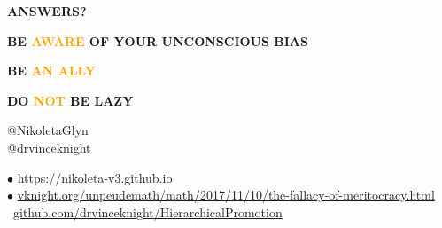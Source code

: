 \documentclass{beamer}
\begin{document}
\begin{frame}
    \centering
    \LARGE \textbf{ANSWERS?}
\end{frame}

\begin{frame}
    \centering
    \LARGE \textbf{BE \textcolor{orange}{AWARE} OF YOUR UNCONSCIOUS BIAS}
\end{frame}

\begin{frame}
    \centering
    \LARGE \textbf{BE \textcolor{orange}{AN ALLY}}
\end{frame}

\begin{frame}
    \centering
    \LARGE \textbf{DO \textcolor{orange}{NOT} BE LAZY}
\end{frame}

\begin{frame}
    \begin{center}
    \faTwitter @NikoletaGlyn \\
    \faTwitter @drvinceknight \\
    
    \vspace{1cm}
    \end{center}

    \footnotesize
    $\bullet$ https://nikoleta-v3.github.io \\
    $\bullet$ \url{vknight.org/unpeudemath/math/2017/11/10/the-fallacy-of-meritocracy.html} \\
    \faGithub  \ \url{github.com/drvinceknight/HierarchicalPromotion}
\end{frame}
\end{document}
